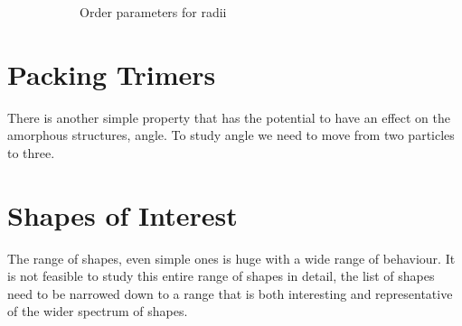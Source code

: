 \begin{figure}
    \begin{subfigure}{0.5\textwidth}
        \caption{Order parameters for radii}
    \end{subfigure}
    \begin{subfigure}{0.5\textwidth}
    \end{subfigure}
\end{figure}

\section{Packing Trimers}

There is another simple property that has the potential to have an effect on the amorphous structures, angle. To study angle we need to move from two particles to three.

\section{Shapes of Interest}

The range of shapes, even simple ones is huge with a wide range of behaviour. It is not feasible to study this entire range of shapes in detail, the list of shapes need to be narrowed down to a range that is both interesting and representative of the wider spectrum of shapes.


